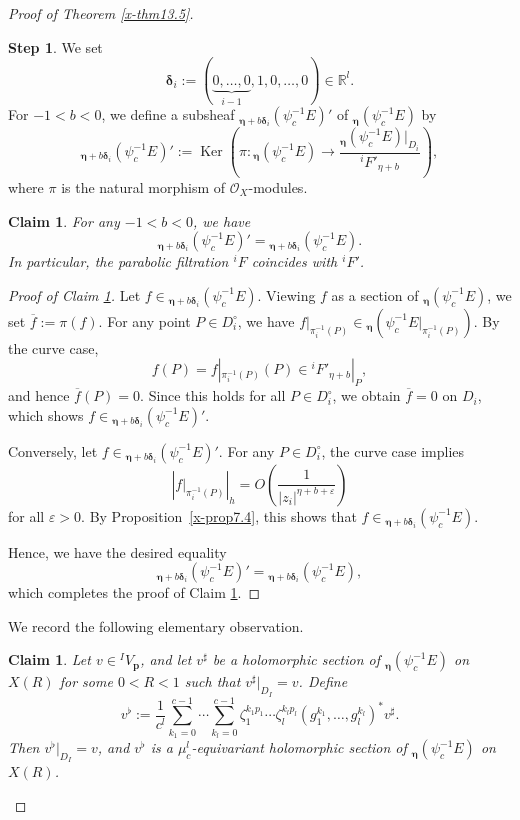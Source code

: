 \documentclass[12pt,twoside]{amsart}
\DeclareMathOperator{\Ker}{Ker}
\newtheorem{claim}[thm]{Claim}
\theoremstyle{definition}
\newtheorem{step}{Step}
\begin{document}
\begin{proof}[Proof of Theorem \ref{x-thm13.5}]
\begin{step}
We set
\[
\bm{\delta}_i :=
(\underbrace{0,\ldots,0}_{i-1},1,0,\ldots,0)\in\mathbb R^l .
\]
For $-1<b<0$, we define a subsheaf
${}_{\bm \eta+b\bm \delta_i} (\psi_c^{-1} E)'$
of ${}_{\bm \eta} (\psi_c^{-1} E)$ by
\[
{}_{\bm \eta+b\bm \delta_i} (\psi_c^{-1} E)'
:= \Ker\!\left(
\pi\colon
{}_{\bm \eta} (\psi_c^{-1} E)\longrightarrow
\frac{{}_{\bm \eta} (\psi_c^{-1} E)|_{D_i}}{{}^i\!F'_{\eta+b}}
\right),
\]
where $\pi$ is the natural morphism of $\mathcal O_X$-modules.

\begin{claim}\label{x-claim13.6}
For any $-1<b<0$, we have
\[
{}_{\bm \eta+b\bm \delta_i} (\psi_c^{-1} E)'
=
{}_{\bm \eta+b\bm \delta_i} (\psi_c^{-1} E).
\]
In particular, the parabolic filtration ${}^i\!F$ coincides with
${}^i\!F'$.
\end{claim}

\begin{proof}[Proof of Claim \ref{x-claim13.6}]
Let $f\in {}_{\bm \eta+b\bm \delta_i} (\psi_c^{-1} E)$.
Viewing $f$ as a section of ${}_{\bm \eta} (\psi_c^{-1} E)$, we set
$\overline f := \pi(f)$.
For any point $P\in D_i^\circ$, we have
$f|_{\pi_i^{-1}(P)} \in
{}_{\bm \eta}(\psi_c^{-1} E|_{\pi_i^{-1}(P)})$.
By the curve case,
\[
f(P)=f|_{\pi_i^{-1}(P)}(P)\in {}^i\!F'_{\eta+b}|_P,
\]
and hence $\overline f(P)=0$.
Since this holds for all $P\in D_i^\circ$, we obtain
$\overline f=0$ on $D_i$, which shows
$f\in {}_{\bm \eta+b\bm \delta_i} (\psi_c^{-1} E)'$.

Conversely, let
$f\in {}_{\bm \eta+b\bm \delta_i} (\psi_c^{-1} E)'$.
For any $P\in D_i^\circ$, the curve case implies
\[
\left|f|_{\pi_i^{-1}(P)}\right|_h
= O\!\left(\frac{1}{|z_i|^{\eta+b+\varepsilon}}\right)
\] 
for all $\varepsilon >0$. 
By Proposition~\ref{x-prop7.4}, this shows that
$f\in {}_{\bm \eta+b\bm \delta_i} (\psi_c^{-1} E)$.

Hence, we have the desired equality 
\[
{}_{\bm \eta+b\bm \delta_i} (\psi_c^{-1} E)' =
{}_{\bm \eta+b\bm \delta_i} (\psi_c^{-1} E),
\] 
which completes the proof of Claim \ref{x-claim13.6}.
\end{proof}

We record the following elementary observation.

\begin{claim}\label{x-claim13.7}
Let $v \in {}^I V_{\bm p}$, and let $v^\sharp$ be a holomorphic section of
${}_{\bm \eta}(\psi_c^{-1}E)$ on $X(R)$ for some $0<R<1$ such that
$v^\sharp|_{D_I}=v$.
Define
\[
v^\flat :=
\frac{1}{c^l}
\sum_{k_1=0}^{c-1}\cdots\sum_{k_l=0}^{c-1}
\zeta_1^{k_1 p_1}\cdots \zeta_l^{k_l p_l}
(g_1^{k_1},\ldots,g_l^{k_l})^* v^\sharp .
\]
Then $v^\flat|_{D_I}=v$, and $v^\flat$ is a $\mu_c^l$-equivariant
holomorphic section of ${}_{\bm \eta}(\psi_c^{-1}E)$ on $X(R)$.
\end{claim}


\end{step}
\end{proof}
\end{document}
